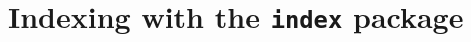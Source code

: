 \documentclass[a4paper]{article}
\begin{document}
\section*{Indexing with the \texttt{index} package}

\nocite{*}

\cite{piccato,gaonkar,malinowski,coleridge,gerhardt,cicero}


\clearpage

\printbibliography
\raggedright
\printindex         %
\printindex[names]  %
\printindex[titles] %
\end{document}
